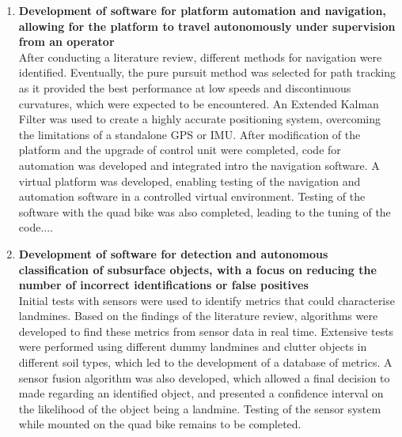 \documentclass[main.tex]{subfiles}
\begin{document}
\begin{enumerate}
\item \textbf{Development of software for platform automation and navigation, allowing for the platform to travel autonomously under supervision from an operator}\\ 
After conducting a literature review, different methods for navigation were identified. Eventually, the pure pursuit method was selected for path tracking as it provided the best performance at low speeds and discontinuous curvatures, which were expected to be encountered. An Extended Kalman Filter was used to create a highly accurate positioning system, overcoming the limitations of a standalone GPS or IMU. After modification of the platform and the upgrade of control unit were completed, code for automation was developed and integrated intro the navigation software. A virtual platform was developed, enabling testing of the navigation and automation software in a controlled virtual environment. Testing of the software with the quad bike was also completed, leading to the tuning of the code....  

\item \textbf{Development of software for detection and autonomous classification of subsurface objects, with a focus on reducing the number of incorrect identifications or false positives}\\ 
Initial tests with sensors were used to identify metrics that could characterise landmines. Based on the findings of the literature review, algorithms were developed to find these metrics from sensor data in real time. Extensive tests were performed using different dummy landmines and clutter objects in different soil types, which led to the development of a database of metrics. A sensor fusion algorithm was also developed, which allowed a final decision to made regarding an identified object, and presented a confidence interval on the likelihood of the object being a landmine. Testing of the sensor system while mounted on the quad bike remains to be completed.


\end{enumerate}
\end{document}

